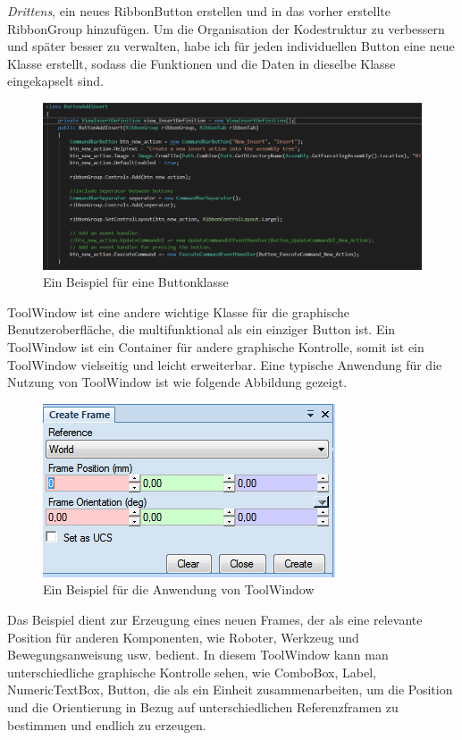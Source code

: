 \documentclass[14pt,a4paper,titlepage]{article}
\begin{document}
\begin{itemize}
				\emph{Drittens},
				 ein neues RibbonButton erstellen und in das vorher erstellte RibbonGroup hinzufügen.
				\bigbreak
				Um die Organisation der Kodestruktur zu verbessern und später besser zu verwalten, habe ich für jeden individuellen Button eine neue Klasse erstellt, sodass die Funktionen und die Daten in dieselbe Klasse eingekapselt sind.
				\bigbreak  
				\begin{figure}[h!]
					\centering
					\includegraphics[width=0.8\linewidth]{buttonclass.png}
					\caption{Ein Beispiel für eine Buttonklasse}
				\end{figure}
				ToolWindow ist eine andere wichtige Klasse für die graphische Benutzeroberfläche, die multifunktional als ein einziger Button ist. Ein ToolWindow ist ein Container für andere graphische Kontrolle, somit ist ein ToolWindow vielseitig und leicht erweiterbar.  Eine typische Anwendung für die Nutzung von ToolWindow ist wie folgende Abbildung gezeigt. \\
				\begin{figure}[h!]
					\centering
					\includegraphics[width=0.8\linewidth]{toolwindow.png}
					\caption{Ein Beispiel für die Anwendung von ToolWindow}
				\end{figure}
				\pagebreak
				Das Beispiel dient zur Erzeugung eines neuen Frames, der als eine relevante Position für anderen Komponenten, wie Roboter, Werkzeug und Bewegungsanweisung usw. bedient. In diesem ToolWindow kann man unterschiedliche graphische Kontrolle sehen, wie ComboBox, Label, NumericTextBox, Button, die als ein Einheit zusammenarbeiten, um die Position und die Orientierung in Bezug auf unterschiedlichen Referenzframen zu bestimmen und endlich zu erzeugen.

\end{itemize}
\end{document}
